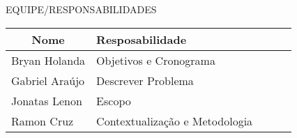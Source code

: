 		
	\begin{center}	
		EQUIPE/RESPONSABILIDADES


		\begin{table}[h]
		\centering
		\begin{tabular}{lllll}
		\hline
		\multicolumn{1}{c}{Nome} & Resposabilidade &  &  &  \\ \hline
		Bryan Holanda            &  Objetivos e Cronograma   &  &  &  \\ \hline
		Gabriel Araújo           & Descrever Problema    &  &  &  \\ \hline
		Jonatas Lenon           &  Escopo          &  &  &  \\ \hline
		Ramon Cruz            &   Contextualização e Metodologia&  &  &  \\ \cline{2-5} 
		\end{tabular}
		\end{table}
	\end{center}
